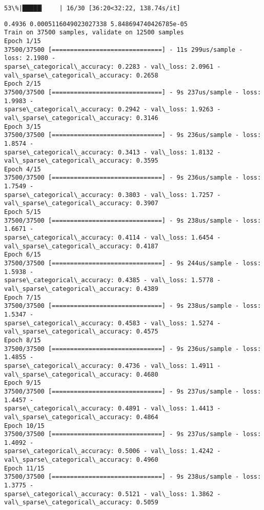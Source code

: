 \documentclass[11pt]{article}
\begin{document}
    \begin{Verbatim}[commandchars=\\\{\}]
 53\%|█████▎    | 16/30 [36:20<32:22, 138.74s/it]
    \end{Verbatim}

    \begin{Verbatim}[commandchars=\\\{\}]
0.4936 0.0005116049023027338 5.848694740426785e-05
Train on 37500 samples, validate on 12500 samples
Epoch 1/15
37500/37500 [==============================] - 11s 299us/sample - loss: 2.1980 -
sparse\_categorical\_accuracy: 0.2283 - val\_loss: 2.0961 -
val\_sparse\_categorical\_accuracy: 0.2658
Epoch 2/15
37500/37500 [==============================] - 9s 237us/sample - loss: 1.9983 -
sparse\_categorical\_accuracy: 0.2942 - val\_loss: 1.9263 -
val\_sparse\_categorical\_accuracy: 0.3146
Epoch 3/15
37500/37500 [==============================] - 9s 236us/sample - loss: 1.8574 -
sparse\_categorical\_accuracy: 0.3413 - val\_loss: 1.8132 -
val\_sparse\_categorical\_accuracy: 0.3595
Epoch 4/15
37500/37500 [==============================] - 9s 236us/sample - loss: 1.7549 -
sparse\_categorical\_accuracy: 0.3803 - val\_loss: 1.7257 -
val\_sparse\_categorical\_accuracy: 0.3907
Epoch 5/15
37500/37500 [==============================] - 9s 238us/sample - loss: 1.6671 -
sparse\_categorical\_accuracy: 0.4114 - val\_loss: 1.6454 -
val\_sparse\_categorical\_accuracy: 0.4187
Epoch 6/15
37500/37500 [==============================] - 9s 244us/sample - loss: 1.5938 -
sparse\_categorical\_accuracy: 0.4385 - val\_loss: 1.5778 -
val\_sparse\_categorical\_accuracy: 0.4389
Epoch 7/15
37500/37500 [==============================] - 9s 238us/sample - loss: 1.5347 -
sparse\_categorical\_accuracy: 0.4583 - val\_loss: 1.5274 -
val\_sparse\_categorical\_accuracy: 0.4575
Epoch 8/15
37500/37500 [==============================] - 9s 236us/sample - loss: 1.4855 -
sparse\_categorical\_accuracy: 0.4736 - val\_loss: 1.4911 -
val\_sparse\_categorical\_accuracy: 0.4680
Epoch 9/15
37500/37500 [==============================] - 9s 237us/sample - loss: 1.4457 -
sparse\_categorical\_accuracy: 0.4891 - val\_loss: 1.4413 -
val\_sparse\_categorical\_accuracy: 0.4864
Epoch 10/15
37500/37500 [==============================] - 9s 237us/sample - loss: 1.4092 -
sparse\_categorical\_accuracy: 0.5006 - val\_loss: 1.4242 -
val\_sparse\_categorical\_accuracy: 0.4960
Epoch 11/15
37500/37500 [==============================] - 9s 238us/sample - loss: 1.3775 -
sparse\_categorical\_accuracy: 0.5121 - val\_loss: 1.3862 -
val\_sparse\_categorical\_accuracy: 0.5059

\end{Verbatim}
\end{document}
